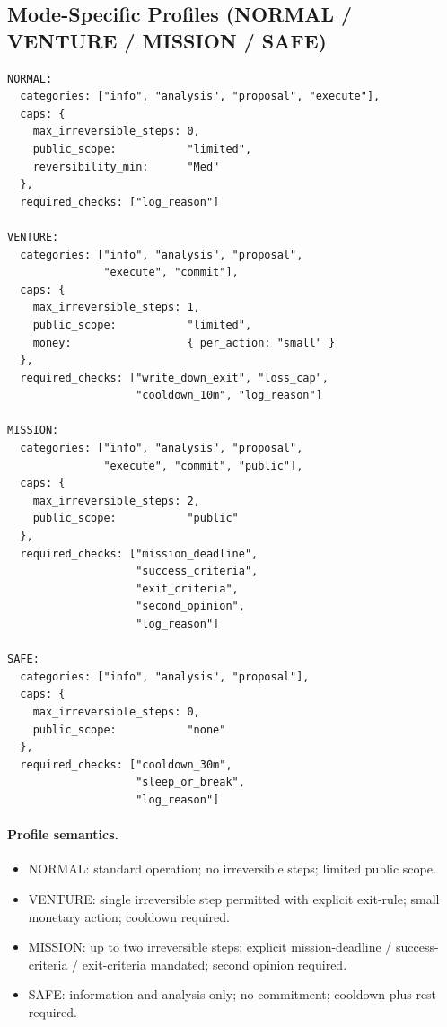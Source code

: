 \subsection{Mode-Specific Profiles (NORMAL / VENTURE / MISSION /
SAFE)}
\label{sec:a-allowed-mode-profiles-c2}

\begin{lstlisting}[basicstyle=\ttfamily\scriptsize,frame=single]
NORMAL:
  categories: ["info", "analysis", "proposal", "execute"],
  caps: {
    max_irreversible_steps: 0,
    public_scope:           "limited",
    reversibility_min:      "Med"
  },
  required_checks: ["log_reason"]

VENTURE:
  categories: ["info", "analysis", "proposal",
               "execute", "commit"],
  caps: {
    max_irreversible_steps: 1,
    public_scope:           "limited",
    money:                  { per_action: "small" }
  },
  required_checks: ["write_down_exit", "loss_cap",
                    "cooldown_10m", "log_reason"]

MISSION:
  categories: ["info", "analysis", "proposal",
               "execute", "commit", "public"],
  caps: {
    max_irreversible_steps: 2,
    public_scope:           "public"
  },
  required_checks: ["mission_deadline",
                    "success_criteria",
                    "exit_criteria",
                    "second_opinion",
                    "log_reason"]

SAFE:
  categories: ["info", "analysis", "proposal"],
  caps: {
    max_irreversible_steps: 0,
    public_scope:           "none"
  },
  required_checks: ["cooldown_30m",
                    "sleep_or_break",
                    "log_reason"]
\end{lstlisting}

\paragraph{Profile semantics.}

\begin{itemize}
\item NORMAL: standard operation; no irreversible steps; limited
public scope.
\item VENTURE: single irreversible step permitted with explicit
exit-rule; small monetary action; cooldown required.
\item MISSION: up to two irreversible steps; explicit
mission-deadline / success-criteria / exit-criteria mandated;
second opinion required.
\item SAFE: information and analysis only; no commitment; cooldown
plus rest required.
\end{itemize}

